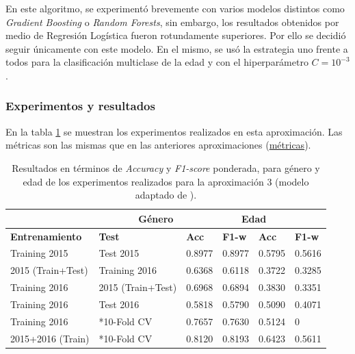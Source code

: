 En este algoritmo, se experimentó brevemente con varios modelos distintos como \textit{Gradient Boosting} o \textit{Random Forests}, sin embargo, los resultados obtenidos por medio de Regresión Logística fueron rotundamente superiores. Por ello se decidió seguir únicamente con este modelo. En el mismo, se usó la estrategia uno frente a todos para la clasificación multiclase de la edad y con el hiperparámetro $C=10^{-3}$.

\subsubsection{Experimentos y resultados}
En la tabla \ref{tab:results_aprox3} se muestran los experimentos realizados en esta aproximación. Las métricas son las mismas que en las anteriores aproximaciones (\hyperref[subsubsec:metricas]{métricas}).

\begin{table}[H]
    \centering
    {
    \setlength{\tabcolsep}{0.6\tabcolsep}

    \begin{tabular}{|l|l|ll|ll|}
        \hhline{------}
        \rowcolor{udcpink!25}
          \multicolumn{2}{|c|}{\textbf{\textit{Dataset}}} & \multicolumn{2}{c|}{\textbf{Género}} & \multicolumn{2}{c|}{\textbf{Edad}} \\ \hline
        \textbf{Entrenamiento} & \textbf{Test} & \textbf{Acc} & \textbf{F1-w} & \textbf{Acc} & \textbf{F1-w}\\ \hline
        Training 2015 & Test 2015 & 0.8977 & 0.8977 & 0.5795 & 0.5616 \\ \hline%
        2015 (Train+Test) & Training 2016 & 0.6368 & 0.6118 & 0.3722 & 0.3285\\ \hline%
        Training 2016 & 2015 (Train+Test) & 0.6968 & 0.6894 & 0.3830 & 0.3351 \\ \hline%
        Training 2016 & Test 2016 & 0.5818 & 0.5790 & 0.5090 & 0.4071 \\ \hline%
        Training 2016 & *10-Fold CV & 0.7657 & 0.7630 & 0.5124 & 0 \\ \hline
        2015+2016 (Train) & *10-Fold CV & 0.8120 & 0.8193 & 0.6423 & 0.5611 \\ \hline
    \end{tabular}%
    }
    \caption{Resultados en términos de \textit{Accuracy} y \textit{F1-score} ponderada, para género y edad de los experimentos realizados para la aproximación 3 (modelo adaptado de \citet{modaresi:2016}).}
    \label{tab:results_aprox3}
\end{table}

